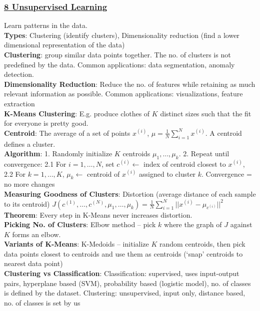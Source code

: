 \documentclass{article}
\begin{document}
{\begin{multicols*}{3}
\subsubsection*{\underline{8 Unsupervised Learning}}
Learn patterns in the data.\\
\textbf{Types}: Clustering (identify clusters), Dimensionality reduction (find a lower dimensional representation of the data)\\
\textbf{Clustering}: group similar data points together. The no. of clusters is not predefined by the data. Common applications: data segmentation, anomaly detection.\\
\textbf{Dimensionality Reduction}: Reduce the no. of features while retaining as much relevant information as possible. Common applications: visualizations, feature extraction \\
\textbf{K-Means Clustering}: E.g. produce clothes of $K$ distinct sizes such that the fit for everyone is pretty good. \\
\textbf{Centroid}: The average of a set of points $x^{(i)}$, $\mu=\frac{1}{N}\sum_{i=1}^Nx^{(i)}$. A centroid defines a cluster.\\
\textbf{Algorithm}: 1. Randomly initialize $K$ centroids $\mu_1,\dots,\mu_k$. 2. Repeat until convergence: 2.1 For $i=1,\dots,N$, set $c^{(i)}\leftarrow$ index of centroid closest to $x^{(i)} $, 2.2 For $k=1,\dots,K$, $\mu_k\leftarrow$ centroid of $x^{(i)} $ assigned to cluster $k$. Convergence = no more changes \\
\textbf{Measuring Goodness of Clusters}: Distortion (average distance of each sample to its centroid) $J(c^{(1)},\dots,c^{(N)},\mu_1,\dots,\mu_k)=\frac{1}{N}\sum^N_{i=1}||x^{(i)}-\mu_{c^{(i)}}||^2$ \\
\textbf{Theorem}: Every step in K-Means never increases distortion.\\
\textbf{Picking No. of Clusters}: Elbow method – pick $k$ where the graph of $J$ against $K$ forms an elbow. \\
\textbf{Variants of K-Means}: K-Medoids – initialize $K$ random centroids, then pick data points closest to centroids and use them as centroids (`snap' centroids to nearest data point) \\
\textbf{Clustering vs Classification}: Classification: supervised, uses input-output pairs, hyperplane based (SVM), probability based (logistic model), no. of classes is defined by the dataset. Clustering: unsupervised, input only, distance based, no. of classes is set by us\\

\end{multicols*}}
\end{document}
